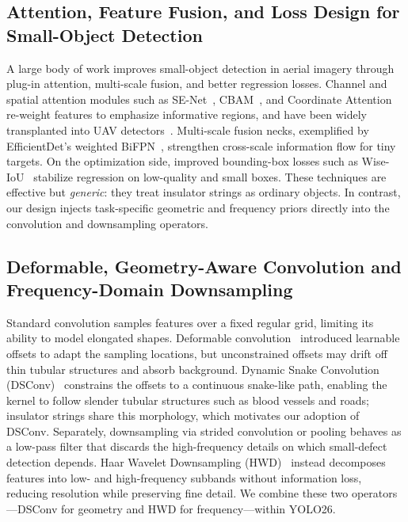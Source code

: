 \documentclass[sensors,article,submit,pdftex,moreauthors]{Definitions/mdpi}
\begin{document}
\subsection{Attention, Feature Fusion, and Loss Design for Small-Object Detection}

A large body of work improves small-object detection in aerial imagery through plug-in attention, multi-scale fusion, and better regression losses. Channel and spatial attention modules such as SE-Net~\cite{hu2018squeeze}, CBAM~\cite{woo2018cbam}, and Coordinate Attention~\cite{hou2021coordinate} re-weight features to emphasize informative regions, and have been widely transplanted into UAV detectors~\cite{yang2023kpe,shang2023small,guo2023unyolo}. Multi-scale fusion necks, exemplified by EfficientDet's weighted BiFPN~\cite{tan2020efficientdet}, strengthen cross-scale information flow for tiny targets. On the optimization side, improved bounding-box losses such as Wise-IoU~\cite{tong2023wiseiou} stabilize regression on low-quality and small boxes. These techniques are effective but \emph{generic}: they treat insulator strings as ordinary objects. In contrast, our design injects task-specific geometric and frequency priors directly into the convolution and downsampling operators.

\subsection{Deformable, Geometry-Aware Convolution and Frequency-Domain Downsampling}

Standard convolution samples features over a fixed regular grid, limiting its ability to model elongated shapes. Deformable convolution~\cite{dai2017deformable} introduced learnable offsets to adapt the sampling locations, but unconstrained offsets may drift off thin tubular structures and absorb background. Dynamic Snake Convolution (DSConv)~\cite{qi2023dynamic} constrains the offsets to a continuous snake-like path, enabling the kernel to follow slender tubular structures such as blood vessels and roads; insulator strings share this morphology, which motivates our adoption of DSConv. Separately, downsampling via strided convolution or pooling behaves as a low-pass filter that discards the high-frequency details on which small-defect detection depends. Haar Wavelet Downsampling (HWD)~\cite{xu2023haar} instead decomposes features into low- and high-frequency subbands without information loss, reducing resolution while preserving fine detail. We combine these two operators---DSConv for geometry and HWD for frequency---within YOLO26.
\end{document}
